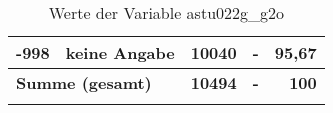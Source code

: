 \begin{longtable}{Xlrrr}
       -998 & keine Angabe & 10040 & - & 95,67 \\

     \midrule
     \multicolumn{2}{l}{\textbf{Summe (gesamt)}} & \textbf{10494} & \textbf{-} & \textbf{100} \\
     \bottomrule
     \caption{Werte der Variable astu022g\_g2o}
     \end{longtable}
     
